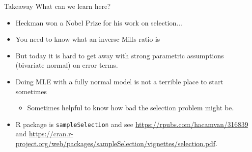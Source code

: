 \documentclass[aspectratio=169,11pt]{beamer}
\begin{document}
\begin{frame}{Takeaway}
What can we learn here?
\begin{itemize}
\item Heckman won a Nobel Prize for his work on selection...
\item You need to know what an \alert{inverse Mills ratio is}
\item But today it is hard to get away with strong parametric assumptions (bivariate normal) on error terms.
\item Doing MLE with a fully normal model is not a terrible place to start sometimes
\begin{itemize}
\item Sometimes helpful to know how bad the selection problem might be.
\end{itemize}
\item R package is \texttt{sampleSelection} and see \url{https://rpubs.com/hacamvan/316839} and \url{https://cran.r-project.org/web/packages/sampleSelection/vignettes/selection.pdf}.
\end{itemize}
\end{frame}
\end{document}
